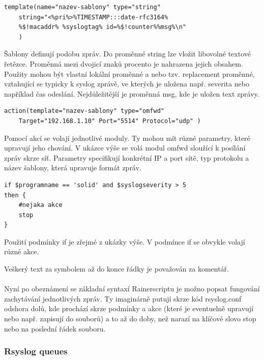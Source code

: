 \documentclass[thesis=B,czech]{FITthesis}[2012/06/26]
\begin{document}
\begin{lstlisting}
template(name="nazev-sablony" type="string"
	string="<%pri%>%TIMESTAMP:::date-rfc3164%
	%$!macaddr% %syslogtag% id=%$!counter%%msg%\n"
	)
\end{lstlisting}
Šablony definují podobu zpráv. Do proměnné string lze vložit libovolné textové řetězce. Proměnná mezi dvojicí znaků procento je nahrazena jejich obsahem. Použity mohou být vlastní lokální proměnné a nebo tzv. replacement proměnné, vztahující se typicky k syslog zprávě, ve kterých je uložena např. severita nebo například čas odeslání. Nejdůležitější je proměnná msg, kde je uložen text zprávy.

\begin{lstlisting}
action(template="nazev-sablony" type="omfwd"
	Target="192.168.1.10" Port="5514" Protocol="udp" )
\end{lstlisting}

Pomocí akcí se volají jednotlivé moduly. Ty mohou mít různé parametry, které upravují jeho chování. V ukázce výše se volá modul omfwd sloužící k posílání zpráv skrze síť. Parametry specifikují konkrétní IP a port sítě, typ protokolu a název šablony, která upravuje formát zpráv.

\begin{lstlisting}
if $programname == 'solid' and $syslogseverity > 5
then {
	#nejaka akce
	stop
}
\end{lstlisting}
	
Použití podmínky if je zřejmé z ukázky výše. V podmínce if se obvykle volají různé akce.

Veškerý text za symbolem \uv{\#} až do konce řádky je považován za komentář.
\\
\\
Nyní po obeznámení se základní syntaxí Rainerscriptu je možno popsat fungování zachytávání jednotlivých zpráv. Ty imaginárně putují skrze kód rsyslog.conf odshora dolů, kde prochází skrze podmínky a akce (které je eventuelně upravují nebo např. zapisují do souborů) a to až do doby, než narazí na klíčové slovo stop nebo na poslední řádek souboru.

\subsubsection*{Rsyslog queues}
\end{document}

